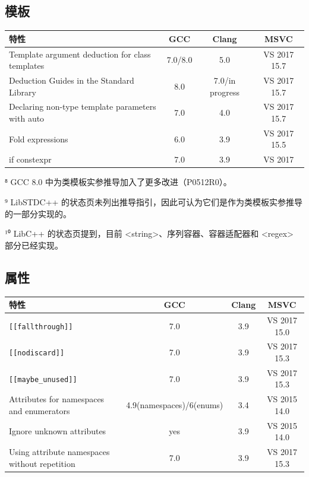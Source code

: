 \subsection{模板}

\begin{table}[H]
\centering
\begin{tabularx}{\textwidth}{X c c c}
\toprule
特性 & GCC & Clang & MSVC \\
\midrule
Template argument deduction for class templates & 7.0/8.0 & 5.0 & VS 2017 15.7 \\
Deduction Guides in the Standard Library & 8.0 & 7.0/in progress & VS 2017 15.7 \\
Declaring non-type template parameters with auto & 7.0 & 4.0 & VS 2017 15.7 \\
Fold expressions & 6.0 & 3.9 & VS 2017 15.5 \\
if constexpr & 7.0 & 3.9 & VS 2017 \\
\bottomrule
\end{tabularx}
\end{table}

⁸ GCC 8.0 中为类模板实参推导加入了更多改进（P0512R0）。

⁹ LibSTDC++ 的状态页未列出推导指引，因此可认为它们是作为类模板实参推导的一部分实现的。

¹⁰ LibC++ 的状态页提到，目前 <string>、序列容器、容器适配器和 <regex> 部分已经实现。

\subsection{属性}

\begin{table}[H]
\centering
\begin{tabularx}{\textwidth}{X c c c}
\toprule
特性 & GCC & Clang & MSVC \\
\midrule
\texttt{\texttt{\texttt{[[fallthrough]]}}} & 7.0 & 3.9 & VS 2017 15.0 \\
\texttt{\texttt{\texttt{[[nodiscard]]}}} & 7.0 & 3.9 & VS 2017 15.3 \\
\texttt{\texttt{\texttt{[[maybe\_unused]]}}} & 7.0 & 3.9 & VS 2017 15.3 \\
Attributes for namespaces and enumerators & 4.9(namespaces)/6(enums) & 3.4 & VS 2015 14.0 \\
Ignore unknown attributes & yes & 3.9 & VS 2015 14.0 \\
Using attribute namespaces without repetition & 7.0 & 3.9 & VS 2017 15.3 \\
\bottomrule
\end{tabularx}
\end{table}

